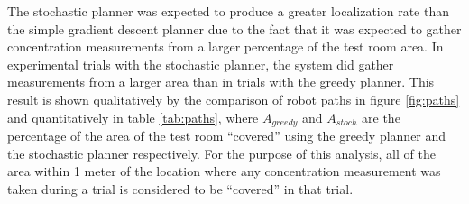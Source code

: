 \documentclass[submit]{aiaa-pretty-modified}
\begin{document}
The stochastic planner was expected to produce a greater localization
rate than the simple gradient descent planner due to the fact that it
was expected to gather concentration measurements from a larger
percentage of the test room area.  In experimental trials with the
stochastic planner, the system did gather measurements from a larger
area than in trials with the greedy planner.  This result is shown
qualitatively by the comparison of robot paths in figure \ref{fig:paths} and
quantitatively in table \ref{tab:paths}, where $A_{greedy}$ and
$A_{stoch}$ are the percentage of the area of the test room ``covered''
using the greedy planner and the stochastic planner respectively.  For
the purpose of this analysis, all of the area within 1 meter of the
location where any concentration measurement was taken during a trial
is considered to be ``covered'' in that trial.
\end{document}

